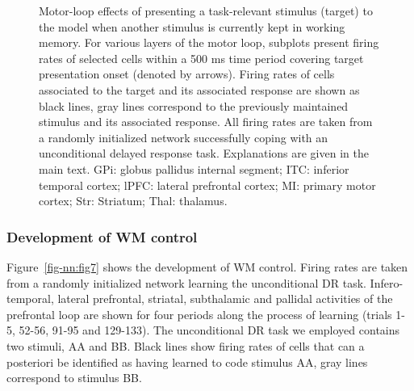 \documentclass[
  11pt,
  a4paper,
]{scrbook}
\begin{document}
\begin{figure}


\caption{\label{fig-nn:fig6}Motor-loop effects of presenting a
task-relevant stimulus (target) to the model when another stimulus is
currently kept in working memory. For various layers of the motor loop,
subplots present firing rates of selected cells within a 500 ms time
period covering target presentation onset (denoted by arrows). Firing
rates of cells associated to the target and its associated response are
shown as black lines, gray lines correspond to the previously maintained
stimulus and its associated response. All firing rates are taken from a
randomly initialized network successfully coping with an unconditional
delayed response task. Explanations are given in the main text. GPi:
globus pallidus internal segment; ITC: inferior temporal cortex; lPFC:
lateral prefrontal cortex; MI: primary motor cortex; Str: Striatum;
Thal: thalamus.}

\end{figure}%

\subsubsection{Development of WM
control}\label{development-of-wm-control}

Figure~\ref{fig-nn:fig7} shows the development of WM control. Firing
rates are taken from a randomly initialized network learning the
unconditional DR task. Infero-temporal, lateral prefrontal, striatal,
subthalamic and pallidal activities of the prefrontal loop are shown for
four periods along the process of learning (trials 1-5, 52-56, 91-95 and
129-133). The unconditional DR task we employed contains two stimuli, AA
and BB. Black lines show firing rates of cells that can a posteriori be
identified as having learned to code stimulus AA, gray lines correspond
to stimulus BB.
\end{document}
